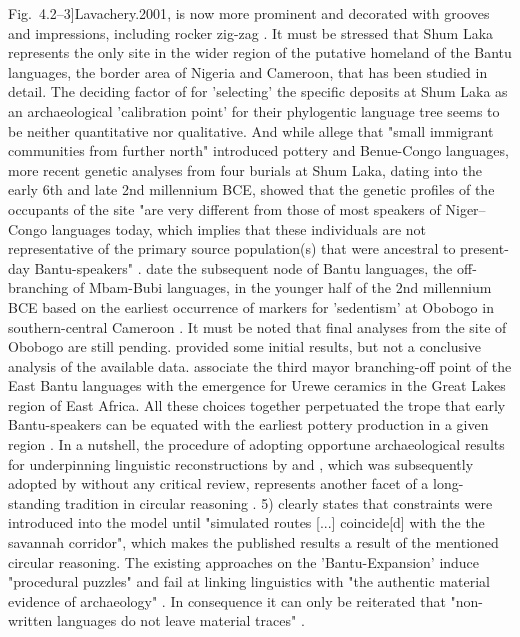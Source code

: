 \begin{reviewer}
{Fig.~4.2–3]{Lavachery.2001}, is now more prominent and decorated with grooves and impressions, including rocker zig-zag \citep[231--232 Fig.~8]{Lavachery.2001}. It must be stressed that Shum Laka represents the only site in the wider region of the putative homeland of the Bantu languages, the border area of Nigeria and Cameroon, that has been studied in detail. The deciding factor of \citet{Grollemund.2015} for 'selecting' the specific deposits at Shum Laka as an archaeological 'calibration point' for their phylogentic language tree seems to be neither quantitative nor qualitative. And while \citet[SI p. 2]{Grollemund.2015} allege that "small immigrant communities from further north" introduced pottery and Benue-Congo languages, more recent genetic analyses from four burials at Shum Laka, dating into the early 6th and late 2nd millennium BCE, showed that the genetic profiles of the occupants of the site "are very different from those of most speakers of Niger–Congo languages today, which implies that these individuals are not representative of the primary source population(s) that were ancestral to present-day Bantu-speakers" \citep[5]{Lipson.2022}. \citet[SI p.~2]{Grollemund.2015} date the subsequent node of Bantu languages, the off-branching of Mbam-Bubi languages, in the younger half of the 2nd millennium BCE based on the earliest occurrence of markers for 'sedentism' at Obobogo in southern-central Cameroon \citep{deMaret.1982,deMaret.1992}. It must be noted that final analyses from the site of Obobogo are still pending. \citet{Claes.1985} provided some initial results, but not a conclusive analysis of the available data. \citet[SI p.~2]{Grollemund.2015} associate the third mayor branching-off point of the East Bantu languages with the emergence for Urewe ceramics in the Great Lakes region of East Africa. All these choices together perpetuated the trope that early Bantu-speakers can be equated with the earliest pottery production in a given region \citep[355, 362, 364]{Bostoen.2015}. In a nutshell, the procedure of adopting opportune archaeological results for underpinning linguistic reconstructions by \citet{Grollemund.2015,Grollemund.2023} and \citet{Bostoen.2015}, which was subsequently adopted by \citet{Koile.2022} without any critical review, represents another facet of a long-standing tradition in circular reasoning \citep{Ehret.1973,Phillipson.1976,Phillipson.1976b,Phillipson.1977a,Heine.1977}. 5) \citet[SI p. 3]{Grollemund.2023} clearly states that constraints were introduced into the model until "simulated routes [...] coincide[d] with the the savannah corridor", which makes the published results a result of the mentioned circular reasoning. The existing approaches on the 'Bantu-Expansion' induce "procedural puzzles" and fail at linking linguistics with "the authentic material evidence of archaeology" \citep[88]{Eggert.2016a}. In consequence it can only be reiterated that "non-written languages do not leave material traces" \citep[85]{Eggert.2016a}.}\label{rev:anti-bantu}
	

\end{reviewer}
